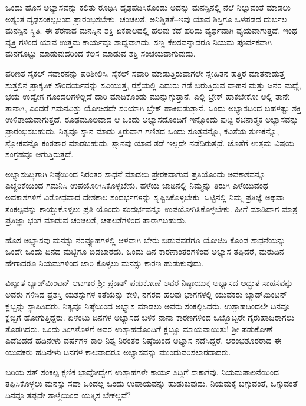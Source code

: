 ಒಂದು ಹೊಸ ಅಭ್ಯಾಸವನ್ನು ಕಲಿತು ರೂಢಿಸಿ ದೃಢಪಡಿಸಿಕೊಂಡು ಅದನ್ನು ಮನಸ್ಸಿನಲ್ಲಿ ನೆಲೆ ನಿಲ್ಲುವಂತೆ ಮಾಡಲು ಅತ್ಯಂತ ದೃಢಸಂಕಲ್ಪದಿಂದ ಪ್ರಾರಂಭಿಸಬೇಕು. ಚಂಚಲತೆ, ಅನಿಶ್ಚಿತತೆ–ಇವು ಯಾವ ಶಿಸ್ತಿಗೂ ಒಳಪಡದ ದುರ್ಬಲ ಮನಸ್ಸಿನ ಸ್ಥಿತಿ. ಈ ತೆರನಾದ ಮನಸ್ಸಿನ ಶಕ್ತಿ ಏಕಕಾಲದಲ್ಲಿ ಹಲವು ಕಡೆ ಹರಿದು ವ್ಯರ್ಥವಾಗಿ ವ್ಯಯವಾಗುತ್ತದೆ. ಇಂಥ ವ್ಯಕ್ತಿ ಗಳಿಂದ ಯಾವ ಉತ್ತಮ ಕಾರ್ಯವೂ ಸಾಧ್ಯವಾಗದು. ಸಣ್ಣ ಕೆಲಸವನ್ನಾದರೂ ನಿಯಮ ಪೂರ್ವಕವಾಗಿ ಮನಗೊಟ್ಟು ಮಾಡುವುದರಿಂದ ಕೆಲಸ ಮಾಡುವ ಶಕ್ತಿ ಸಂಚಯವಾಗುವುದು.

\vskip 2pt

ಪರಿಣತ ಸೈಕಲ್ ಸವಾರನನ್ನು ಪರಿಶೀಲಿಸಿ. ಸೈಕಲ್ ಸವಾರಿ ಮಾಡುತ್ತಿರುವಾಗಲೇ ಸ್ನೇಹಿತನ ಹತ್ತಿರ ಮಾತನಾಡುತ್ತ ಸುತ್ತಲಿನ ಪ್ರಾಕೃತಿಕ ಸೌಂದರ್ಯವನ್ನು ಸವಿಯುತ್ತ, ರಸ್ತೆಯಲ್ಲಿ ಎದುರು ಗಡೆ ಬರುತ್ತಿರುವ ವಾಹನ ಮತ್ತು ಜನರ ಮಧ್ಯೆ, ಭಯ ಉದ್ವೇಗ ಗೊಂದಲಗಳಿಲ್ಲದೆ ದಾರಿ ಮಾಡಿಕೊಂಡು ಮುನ್ನುಗ್ಗುತ್ತಾನೆ. ಎಲ್ಲಿ ಬ್ರೇಕ್ ಹಾಕಬೇಕೋ ಅಲ್ಲಿ ತಾನೇ ತಾನಾಗಿ, ಎಂದರೆ ಗಮನವಿತ್ತು ಯೋಚಿಸದೇ ಸರಿಯಾಗಿ ಬ್ರೇಕ್ ಹಾಕಿಬಿಡುತ್ತಾನೆ. ಒಂದು ಅಭ್ಯಾಸದಿಂದ ಬಹಳಷ್ಟು ಶಕ್ತಿ ಉಳಿತಾಯವಾಗುತ್ತದೆ. ರೂಢಮೂಲವಾದ ಆ ಒಂದು ಅಭ್ಯಾಸದೊಂದಿಗೆ ಇನ್ನೊಂದು ಪುಟ್ಟ ರಚನಾತ್ಮಕ ಅಭ್ಯಾಸವನ್ನು ಪ್ರಾರಂಭಿಸಬಹುದು. ನಿತ್ಯವೂ ಸ್ನಾನ ಮಾಡು ತ್ತಿರುವಾಗ ಗಣಿತದ ಒಂದು ಸೂತ್ರವನ್ನೊ, ಕವಿತೆಯ ತುಣಕನ್ನೊ, ಶ್ಲೋಕವನ್ನೊ ಕಂಠಪಾಠ ಮಾಡಬಹುದು. ಸ್ನಾನವು ಯಾವ ತಡೆ ಇಲ್ಲದೇ ನಡೆದಿರುತ್ತದೆ. ಜೊತೆಗೆ ಉತ್ತಮ ವಿಷಯ ಸಂಗ್ರಹವೂ ಆಗುತ್ತಿರುತ್ತದೆ.

\vskip 2pt

ಅಭ್ಯಾಸಸಿದ್ಧಿಗಾಗಿ ನಿಷ್ಠೆಯಿಂದ ನಿರಂತರ ಸಾಧನೆ ಮಾಡಲು ಪ್ರೇರಕವಾಗುವ ಪ್ರತಿಯೊಂದು ಅವಕಾಶವನ್ನೂ ಎಚ್ಚರಿಕೆಯಿಂದ ಗಮನಿಸಿ ಉಪಯೋಗಿಸಿಕೊಳ್ಳಬೇಕು. ಹಳೆಯ ಜಾಡಿನಲ್ಲಿ ನಿಮ್ಮನ್ನು ತಿರುಗಿ ಎಳೆಯುವಂಥ ಅವಕಾಶಗಳಿಗೆ ವಿರೋಧವಾದ ದೇಶಕಾಲ ಸಂದರ್ಭಗಳನ್ನು ಸೃಷ್ಟಿಸಿಕೊಳ್ಳಬೇಕು. ಒಟ್ಟಿನಲ್ಲಿ ನಿಮ್ಮ ಪ್ರತಿಜ್ಞೆ ಅಥವಾ ಸಂಕಲ್ಪವನ್ನು ಕಾಯ್ದುಕೊಳ್ಳಲು ಪ್ರತಿ ಯೊಂದು ಸಂದರ್ಭವನ್ನೂ ಉಪಯೋಗಿಸಿಕೊಳ್ಳಬೇಕು. ಹೀಗೆ ಮಾಡಿದಾಗ ಮಾತ್ರ ಪ್ರತಿಜ್ಞಾ ಭಂಗ ಮಾಡುವ ಚಂಚಲತೆ, ಚಪಲತೆಗಳಿಂದ ಪಾರಾಗಬಹುದು.

\vskip 2pt

ಹೊಸ ಅಭ್ಯಾಸವು ಮನಸ್ಸು ನರವ್ಯೂಹಗಳಲ್ಲಿ ಆಳವಾಗಿ ಬೇರು ಬಿಡುವವರೆಗೂ ಯೋಜಿಸಿ ಕೊಂಡ ಸಾಧನೆಯನ್ನು ಒಂದೇ ಒಂದು ದಿನದ ಮಟ್ಟಿಗೂ ಬಿಡಬಾರದು. ಒಂದು ದಿನ ಕಾರಣಾಂತರಗಳಿಂದ ಅಭ್ಯಾಸ ತಪ್ಪಿದರೆ, ಮರುದಿನ ಹೇಗಾದರೂ ನಿಯಮಗಳಿಂದ ಜಾರಿ ಕೊಳ್ಳಲು ಮನಸ್ಸು ಕಾರಣ ಹುಡುಕುವುದು.

ವಿಖ್ಯಾತ ಬ್ಯಾಡ್​ಮಿಂಟನ್ ಆಟಗಾರ ಶ‍್ರೀ ಪ್ರಕಾಶ್ ಪಡುಕೋಣೆ ಅವರ ನಿಷ್ಠಾಯುಕ್ತ ಅಭ್ಯಾಸದ ಅದ್ಭುತ ಸಾಹಸವನ್ನು ಅವರು ಗಳಿಸಿದ ಪ್ರಶಸ್ತಿ ಯಶಸ್ಸುಗಳ ಕತೆಯನ್ನು ಕೇಳಿ, ನಗರದ ಹಲವು ಭಾಗಗಳಲ್ಲಿ ಯುವಕರು ಬ್ಯಾಡ್​ಮಿಂಟನ್ ಕ್ಲಬ್ಬನ್ನು ಸ್ಥಾಪಿಸಿದರು. ನಿತ್ಯವೂ ನಿಷ್ಠೆಯಿಂದ ಅಭ್ಯಾಸ ಮಾಡಲು ಅವರು ಸಂಕಲ್ಪಿಸಿದರು. ಉತ್ಸಾಹದಿಂದಲೇ ದಿನವೂ ಕ್ಲಬ್ಬಿಗೆ ಹೋಗುತ್ತಿದ್ದರು. ಏಳೆಂಟು ದಿನಗಳ ಅಭ್ಯಾಸದ ಬಳಿಕ ನಾನಾ ಕಾರಣಗಳಿಂದ ಒಬ್ಬೊಬ್ಬರೇ ಗೈರುಹಾಜರಾಗಲು ತೊಡಗಿದರು. ಒಂದು ತಿಂಗಳೊಳಗೆ ಅವರ ಉತ್ಸಾಹದೊಂದಿಗೆ ಕ್ಲಬ್ಬೂ ಮಾಯವಾಯಿತು! ಶ‍್ರೀ ಪಡುಕೋಣೆ ಎಡೆಬಿಡದೆ ಹದಿನೇಳು ವರ್ಷಗಳ ಕಾಲ ನಿತ್ಯ ನಿರಂತರ ನಿಷ್ಠೆಯಿಂದ ಅಭ್ಯಾಸ ನಡೆಸಿದ್ದರೆ, ಆರಂಭಶೂರರಾದ ಈ ಯುವಕರು ಹದಿನೇಳು ದಿನಗಳ ಕಾಲವಾದರೂ ಅಭ್ಯಾಸವನ್ನು ಮುಂದುವರಿಸಲಾರದಾದರು.

ಬರಿಯ ಸತ್ ಸಂಕಲ್ಪ ಕ್ಷಣಿಕ ಭಾವೋದ್ವೇಗ ಉತ್ಸಾಹಗಳೇ ಕಾರ್ಯ ಸಿದ್ಧಿಗೆ ಸಾಕಾಗವು. ನಿಯಮಪಾಲನೆಯಿಂದ ತಪ್ಪಿಸಿಕೊಳ್ಳಲು ಮನಸ್ಸು ಸದಾ ಒಂದಲ್ಲ ಒಂದು ಉಪಾಯವನ್ನು ಹುಡುಕುವುದು. ನಿಯಮಕ್ಕೆ ಬಗ್ಗುವಂತೆ, ಒಗ್ಗುವಂತೆ ದಿನವೂ ತಪ್ಪದೇ ತಾಳ್ಮೆಯಿಂದ ಯತ್ನಿಸ ಬೇಕಲ್ಲವೆ?


